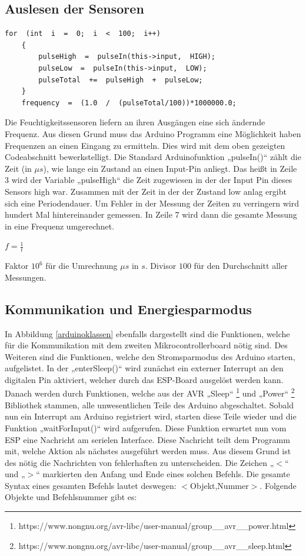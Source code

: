 \newpage
\subsection{Auslesen der Sensoren}
\begin{lstlisting}[caption=Codeabschnitt zum Auslesen]
    for  (int  i  =  0;  i  <  100;  i++)
    {
        pulseHigh  =  pulseIn(this->input,  HIGH);
        pulseLow  =  pulseIn(this->input,  LOW);
        pulseTotal  +=  pulseHigh  +  pulseLow;
    }
    frequency  =  (1.0  /  (pulseTotal/100))*1000000.0;
\end{lstlisting}
Die Feuchtigkeitssensoren liefern an ihren Ausgängen eine sich ändernde
Frequenz. Aus diesen Grund muss das Arduino Programm eine Möglichkeit
haben Frequenzen an einen Eingang zu ermitteln. Dies wird mit dem oben
gezeigten Codeabschnitt bewerkstelligt. Die Standard Arduinofunktion
„pulseIn()“ zählt die Zeit (in $\mu s$), wie lange ein Zustand an
einen Input-Pin anliegt. Das heißt in Zeile 3 wird der Variable
„pulseHigh“ die Zeit zugewiesen in der der Input Pin dieses Sensors
high war. Zusammen mit der Zeit in der der Zustand low anlag
ergibt sich eine Periodendauer. Um Fehler in der Messung der Zeiten
zu verringern wird hundert Mal hintereinander gemessen. In Zeile 7
wird dann die gesamte Messung in eine Frequenz umgerechnet.
\begin{center}
    $f=\frac{1}{t}$
\end{center}
Faktor $10^6$ für die Umrechnung $\mu s$ in $s$.
Divisor $100$ für den Durchschnitt aller Messungen.


\subsection{Kommunikation und Energiesparmodus}
In Abbildung \ref{arduinoklassen} ebenfalls dargestellt sind die Funktionen,
welche für die Kommunikation mit dem zweiten Mikrocontrollerboard nötig sind.
Des Weiteren sind die Funktionen, welche den Stromsparmodus des Arduino
starten, aufgelistet. In der „enterSleep()“ wird zunächst ein externer
Interrupt an den digitalen Pin aktiviert, welcher durch das ESP-Board
ausgelöst werden kann. Danach werden durch Funktionen, welche aus der
AVR „Sleep“ \footnote{https://www.nongnu.org/avr-libc/user-manual/group\_\_avr\_\_power.html}
und „Power“ \footnote{https://www.nongnu.org/avr-libc/user-manual/group\_\_avr\_\_sleep.html}  Bibliothek stammen, alle unwesentlichen
Teile des Arduino abgeschaltet.
Sobald nun ein Interrupt am Arduino
registriert wird, starten diese Teile wieder und die Funktion
„waitForInput()“ wird aufgerufen.
Diese Funktion erwartet nun vom ESP eine Nachricht am serielen Interface. Diese Nachricht
teilt dem Programm mit, welche Aktion als nächstes ausgeführt werden muss. Aus diesem
Grund ist des nötig die Nachrichten von fehlerhaften zu unterscheiden. Die Zeichen „$<$“ und „$>$“
markierten den Anfang und Ende eines solchen Befehls. Die gesamte Syntax eines gesamten Befehls
lautet deswegen: $<$Objekt,Nummer$>$. Folgende Objekte und Befehlsnummer gibt es:
\newline


